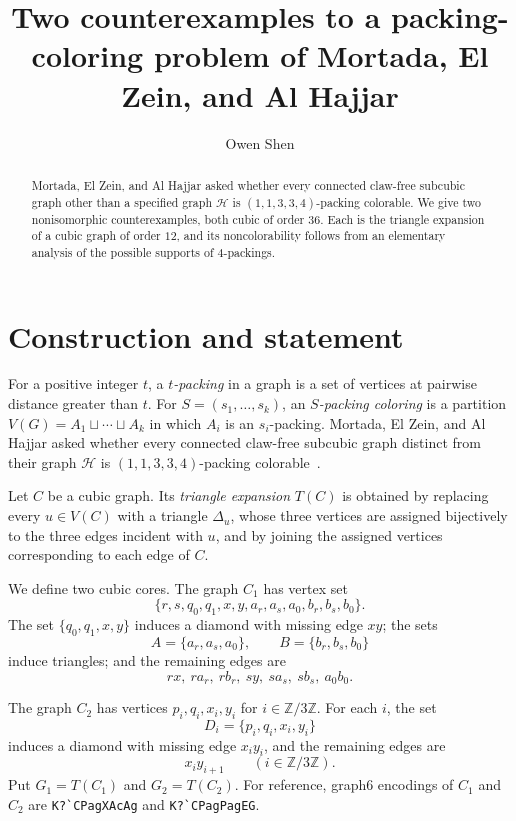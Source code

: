 \documentclass[11pt]{amsart}
\title[Counterexamples to a packing-coloring problem]
{Two counterexamples to a packing-coloring problem of Mortada, El Zein, and Al Hajjar}
\author{Owen Shen}
\date{}
\newcommand{\Zthree}{\mathbb Z/3\mathbb Z}
\begin{document}
\begin{abstract}
Mortada, El Zein, and Al Hajjar asked whether every connected claw-free
subcubic graph other than a specified graph $\mathcal H$ is
$(1,1,3,3,4)$-packing colorable. We give two nonisomorphic counterexamples,
both cubic of order $36$. Each is the triangle expansion of a cubic graph
of order $12$, and its noncolorability follows from an elementary analysis
of the possible supports of $4$-packings.
\end{abstract}

\maketitle

\section{Construction and statement}

For a positive integer $t$, a \emph{$t$-packing} in a graph is a set of
vertices at pairwise distance greater than $t$. For
$S=(s_1,\ldots,s_k)$, an \emph{$S$-packing coloring} is a partition
$V(G)=A_1\sqcup\cdots\sqcup A_k$ in which $A_i$ is an $s_i$-packing.
Mortada, El Zein, and Al Hajjar asked whether every connected claw-free
subcubic graph distinct from their graph $\mathcal H$ is
$(1,1,3,3,4)$-packing colorable~\cite[Problem~1]{MEH}.

Let $C$ be a cubic graph. Its \emph{triangle expansion} $T(C)$ is obtained
by replacing every $u\in V(C)$ with a triangle $\Delta_u$, whose three
vertices are assigned bijectively to the three edges incident with $u$,
and by joining the assigned vertices corresponding to each edge of $C$.

We define two cubic cores. The graph $C_1$ has vertex set
\[
 \{r,s,q_0,q_1,x,y,a_r,a_s,a_0,b_r,b_s,b_0\}.
\]
The set $\{q_0,q_1,x,y\}$ induces a diamond with missing edge $xy$; the
sets
\[
 A=\{a_r,a_s,a_0\},\qquad B=\{b_r,b_s,b_0\}
\]
induce triangles; and the remaining edges are
\[
 rx,\ ra_r,\ rb_r,\ sy,\ sa_s,\ sb_s,\ a_0b_0.
\]

The graph $C_2$ has vertices $p_i,q_i,x_i,y_i$ for $i\in\Zthree$. For
each $i$, the set
\[
 D_i=\{p_i,q_i,x_i,y_i\}
\]
induces a diamond with missing edge $x_i y_i$, and the remaining edges are
\[
 x_i y_{i+1}\qquad(i\in\Zthree).
\]
Put $G_1=T(C_1)$ and $G_2=T(C_2)$. For reference, graph6 encodings of
$C_1$ and $C_2$ are \verb|K?`CPagXAcAg| and \verb|K?`CPagPagEG|.
\end{document}
